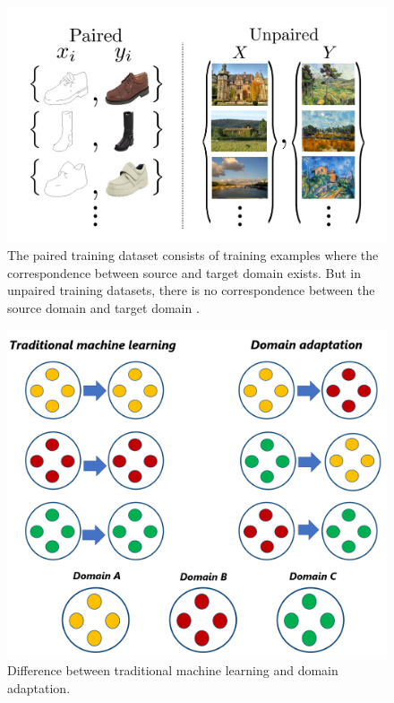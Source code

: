 \begin{figure}[H]
        \begin{center}
	    \includegraphics[scale=0.50]{images/Introduction/img_translation.JPG}
	    \caption[The paired training dataset consists of training examples where the correspondence between source and target domain exists. But in unpaired training datasets, there is no correspondence between the source domain and target domain \cite{zhu2020unpaired}.]{The paired training dataset consists of training examples where the correspondence between source and target domain exists. But in unpaired training datasets, there is no correspondence between the source domain and target domain \cite{zhu2020unpaired}.}
	    \label{fig:img_translation}
	    \end{center}
\end{figure}


\begin{figure}[H]
        \begin{center}
	 	    \includegraphics[scale=0.28]{images/Introduction/DomainAdaptation.png}
	    \caption[Difference between traditional machine learning and domain adaptation.]{Difference between traditional machine learning and domain adaptation.}
	    \label{fig:DomainAdaptation}
	    \end{center}
\end{figure}




